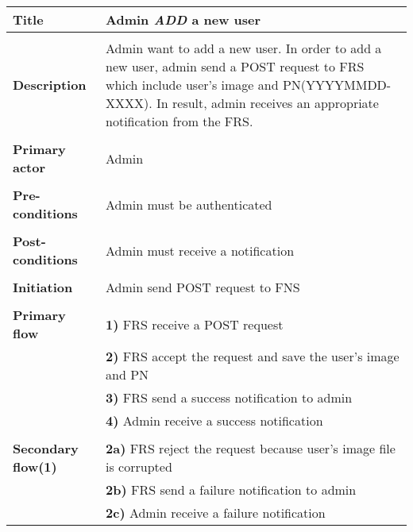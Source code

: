 \documentclass[a4paper,11pt]{article}
\begin{document}
\begin{tabular}{|p{3.5cm}|p{11.5cm}|} \hline
    \textbf{Title} &   Admin \emph{ADD} a new user
        
    \\ \hline \rowcolor{Gray} & \\ \hline
        
    \textbf{Description} &  Admin want to add a new user. In order to add a new user, admin send a POST request to FRS which include user's image and PN(YYYYMMDD-XXXX). In result, admin receives an appropriate notification from the FRS.
        
    \\ \hline \rowcolor{Gray} & \\ \hline
        
    \textbf{Primary actor} & Admin  
        
    \\ \hline \rowcolor{Gray} & \\ \hline 
          
    \textbf{Pre-conditions} &   Admin must be authenticated
        
    \\ \hline \rowcolor{Gray} & \\ \hline
         
    \textbf{Post-conditions} &   Admin must receive a notification
        
    \\ \hline \rowcolor{Gray} & \\ \hline 
         
    \textbf{Initiation} & Admin send POST request to FNS
        
    \\ \hline \rowcolor{Gray} & \\ \hline 
         
    \textbf{Primary flow} & 
    \textbf{1)} FRS receive a POST request \\&
    \textbf{2)} FRS accept the request and save the user's image and PN \\&
    \textbf{3)} FRS send a success notification to admin \\&
    \textbf{4)} Admin receive a success notification
        
    \\ \hline \rowcolor{Gray} & \\ \hline 
         
    \textbf{Secondary flow(1)} & 
    \textbf{2a)} FRS reject the request because user's image file is corrupted \\&
    \textbf{2b)} FRS send a failure notification to admin\\&
    \textbf{2c)} Admin receive a failure notification
     

\end{tabular}
\end{document}
